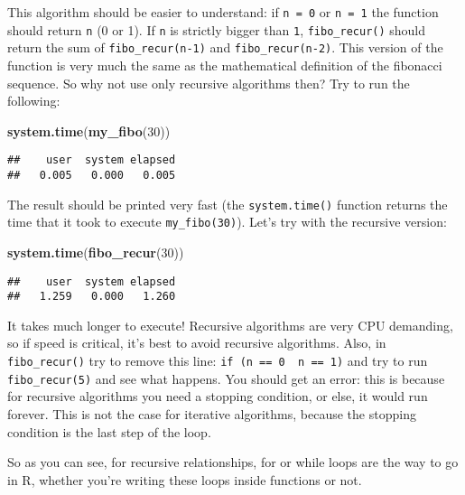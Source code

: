 \documentclass[
]{article}
\newenvironment{Shaded}{\begin{snugshade}}{\end{snugshade}}
\newcommand{\DecValTok}[1]{\textcolor[rgb]{0.00,0.00,0.81}{#1}}
\newcommand{\KeywordTok}[1]{\textcolor[rgb]{0.13,0.29,0.53}{\textbf{#1}}}
\newcommand{\NormalTok}[1]{#1}
\begin{document}
This algorithm should be easier to understand: if \texttt{n\ =\ 0} or \texttt{n\ =\ 1} the function should return \texttt{n}
(0 or 1). If \texttt{n} is strictly bigger than \texttt{1}, \texttt{fibo\_recur()} should return the sum of
\texttt{fibo\_recur(n-1)} and \texttt{fibo\_recur(n-2)}. This version of the function is very much the same as the
mathematical definition of the fibonacci sequence. So why not use only recursive algorithms
then? Try to run the following:

\begin{Shaded}
\begin{Highlighting}[]
\KeywordTok{system.time}\NormalTok{(}\KeywordTok{my\_fibo}\NormalTok{(}\DecValTok{30}\NormalTok{))}
\end{Highlighting}
\end{Shaded}

\begin{verbatim}
##    user  system elapsed 
##   0.005   0.000   0.005
\end{verbatim}

The result should be printed very fast (the \texttt{system.time()} function returns the time that it took
to execute \texttt{my\_fibo(30)}). Let's try with the recursive version:

\begin{Shaded}
\begin{Highlighting}[]
\KeywordTok{system.time}\NormalTok{(}\KeywordTok{fibo\_recur}\NormalTok{(}\DecValTok{30}\NormalTok{))}
\end{Highlighting}
\end{Shaded}

\begin{verbatim}
##    user  system elapsed 
##   1.259   0.000   1.260
\end{verbatim}

It takes much longer to execute! Recursive algorithms are very CPU demanding, so if speed is
critical, it's best to avoid recursive algorithms. Also, in \texttt{fibo\_recur()} try to remove this line:
\texttt{if\ (n\ ==\ 0\ \textbar{}\textbar{}\ n\ ==\ 1)} and try to run \texttt{fibo\_recur(5)} and see what happens. You should
get an error: this is because for recursive algorithms you need a stopping condition, or else,
it would run forever. This is not the case for iterative algorithms, because the stopping
condition is the last step of the loop.

So as you can see, for recursive relationships, for or while loops are the way to go in R, whether
you're writing these loops inside functions or not.
\end{document}
